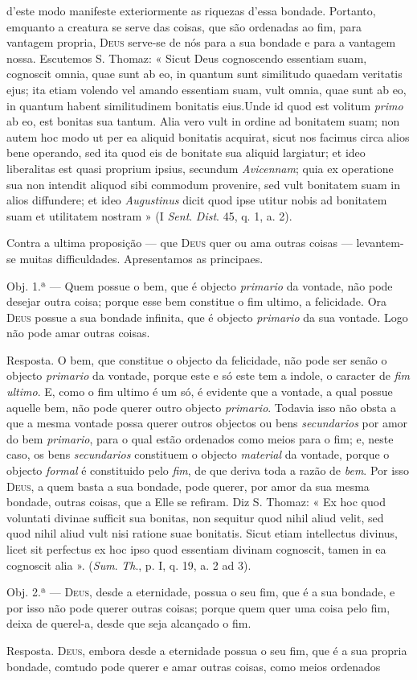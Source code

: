 d'este modo manifeste exteriormente as riquezas d'essa bondade. Portanto, emquanto a creatura se serve das coisas, que são ordenadas ao fim, para vantagem propria, \textsc{Deus} serve-se de nós para a sua bondade e para a vantagem nossa. Escutemos S. Thomaz: « Sicut Deus cognoscendo essentiam suam, cognoscit omnia, quae sunt ab eo, in quantum sunt similitudo quaedam veritatis ejus; ita etiam volendo vel amando essentiam suam, vult omnia, quae sunt ab eo, in quantum habent similitudinem bonitatis eius.Unde id quod est volitum \emph{primo} ab eo, est bonitas sua tantum. Alia vero vult in ordine ad bonitatem suam; non autem hoc modo ut per ea aliquid bonitatis acquirat, sicut nos facimus circa alios bene operando, sed ita quod eis de bonitate sua aliquid largiatur; et ideo liberalitas est quasi proprium ipsius, secundum \emph{Avicennam}; quia ex operatione sua non intendit aliquod sibi commodum provenire, sed vult bonitatem suam in alios diffundere; et ideo \emph{Augustinus} dicit quod ipse utitur nobis ad bonitatem suam et utilitatem nostram » (I \emph{Sent}. \emph{Dist}. 45, q. 1, a. 2).\par Contra a ultima proposição --- que \textsc{Deus} quer ou ama outras coisas --- levantem-se muitas difficuldades. Apresentamos as principaes.\par Obj. 1.ª --- Quem possue o bem, que é objecto \emph{primario} da vontade, não pode desejar outra coisa; porque esse bem constitue o fim ultimo, a felicidade. Ora \textsc{Deus} possue a sua bondade infinita, que é objecto \emph{primario} da sua vontade. Logo não pode amar outras coisas.\par Resposta. O bem, que constitue o objecto da felicidade, não pode ser senão o objecto \emph{primario} da vontade, porque este e só este tem a indole, o caracter de \emph{fim ultimo}. E, como o fim ultimo é um só, é evidente que a vontade, a qual possue aquelle bem, não pode querer outro objecto \emph{primario}. Todavia isso não obsta a que a mesma vontade possa querer outros objectos ou bens \emph{secundarios} por amor do bem \emph{primario}, para o qual estão ordenados como meios para o fim; e, neste caso, os bens \emph{secundarios} constituem o objecto \emph{material} da vontade, porque o objecto \emph{formal} é constituido pelo \emph{fim}, de que deriva toda a razão de \emph{bem}. Por isso \textsc{Deus}, a quem basta a sua bondade, pode querer, por amor da sua mesma bondade, outras coisas, que a Elle se refiram. Diz S. Thomaz: « Ex hoc quod voluntati divinae sufficit sua bonitas, non sequitur quod nihil aliud velit, sed quod nihil aliud vult nisi ratione suae bonitatis. Sicut etiam intellectus divinus, licet sit perfectus ex hoc ipso quod essentiam divinam cognoscit, tamen in ea cognoscit alia ». (\emph{Sum}. \emph{Th}., p. I, q. 19, a. 2 ad 3).\par Obj. 2.ª --- \textsc{Deus}, desde a eternidade, possua o seu fim, que é a sua bondade, e por isso não pode querer outras coisas; porque quem quer uma coisa pelo fim, deixa de querel-a, desde que seja alcançado o fim.\par Resposta. \textsc{Deus}, embora desde a eternidade possua o seu fim, que é a sua propria bondade, comtudo pode querer e amar outras coisas, como meios ordenados 